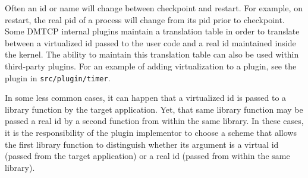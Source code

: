 \documentclass{article}
\begin{document}
Often an id or name will change between checkpoint and restart.
For example, on restart, the real pid of a process will change
from its pid prior to checkpoint.  Some DMTCP internal plugins
maintain a translation table in order to translate
between a virtualized id passed to the user code and a real id
maintained inside the kernel.  The ability to maintain this
translation table can also be used within third-party plugins.
For an example of adding virtualization to a plugin, see the plugin
in {\tt src/plugin/timer}.

In some less common cases, it can happen that a virtualized id is passed
to a library function by the target application.  Yet, that same library
function may be passed a real id by a second function from within the
same library.  In these cases, it is the responsibility of the
plugin implementor to choose a scheme that allows the first library
function to distinguish whether its argument is a virtual id (passed
from the target application) or a real id (passed from within the same
library).
\end{document}
